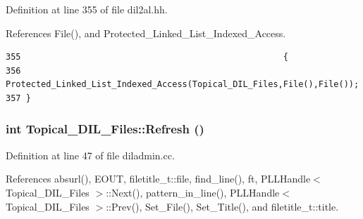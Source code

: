 Definition at line 355 of file dil2al.hh.

References File(), and Protected\_\-Linked\_\-List\_\-Indexed\_\-Access.



\footnotesize\begin{verbatim}355                                                    {
356         Protected_Linked_List_Indexed_Access(Topical_DIL_Files,File(),File());
357 }
\end{verbatim}\normalsize 
{}
\subsubsection{\setlength{\rightskip}{0pt plus 5cm}int Topical\_\-DIL\_\-Files::Refresh ()}\label{classTopical__DIL__Files_a7}




Definition at line 47 of file diladmin.cc.

References absurl(), EOUT, filetitle\_\-t::file, find\_\-line(), ft, PLLHandle$<$ Topical\_\-DIL\_\-Files $>$::Next(), pattern\_\-in\_\-line(), PLLHandle$<$ Topical\_\-DIL\_\-Files $>$::Prev(), Set\_\-File(), Set\_\-Title(), and filetitle\_\-t::title.



